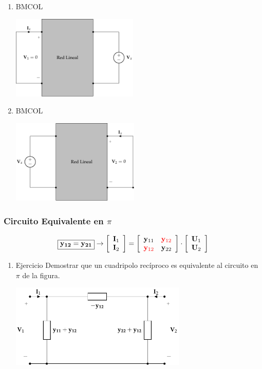 \begin{enumerate}
\item \hfill{}\textsc{BMCOL}
\label{sec:org6237778}

\includegraphics[height=4cm]{../figs/reciprocidadY_entrada.pdf}

\item \hfill{}\textsc{BMCOL}
\label{sec:orgf1cf80d}

\includegraphics[height=4cm]{../figs/reciprocidadY_salida.pdf}

\end{enumerate}
\subsubsection{Circuito Equivalente en \(\pi\)}
\label{sec:org2f3cf9b}
\[
\boxed{\mathbf{y_{12}} = \mathbf{y_{21}}}
\rightarrow
\left[
    \begin{array}{c}
      \mathbf{I}_1\\
      \mathbf{I}_2
    \end{array}
  \right] =
  \left[
    \begin{array}{cc}
      \mathbf{y}_{11} & \color{red}{\mathbf{y}_{12}}\\
      \color{red}{\mathbf{y}_{12}} & \mathbf{y}_{22}
    \end{array}
  \right] \cdot
  \left[
    \begin{array}{c}
      \mathbf{U}_1\\
      \mathbf{U}_2
    \end{array}
  \right]
\]

\begin{enumerate}
\item Ejercicio
\label{sec:orgeb5b5d1}
Demostrar que un cuadripolo recíproco es equivalente al circuito en \(\pi\) de la figura.

\includegraphics[height=4cm]{../figs/circuitoEquivalenteYReciproco.pdf}

\end{enumerate}


